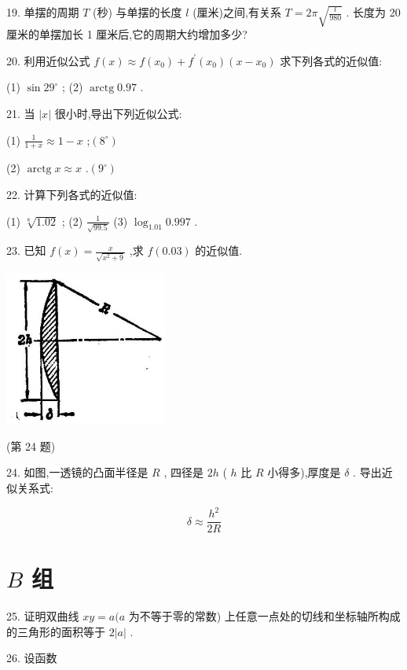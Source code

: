 \documentclass[lang=cn,newtx,12pt,scheme=chinese]{elegantbook}
\begin{document}
19. 单摆的周期 \(T\) (秒) 与单摆的长度 \(l\) (厘米)之间,有关系 \(T = {2\pi }\sqrt{\frac{l}{980}}\) . 长度为 20 厘米的单摆加长 1 厘米后,它的周期大约增加多少?

20. 利用近似公式 \(f\left( x\right) \approx f\left( {x}_{0}\right) + {f}^{\prime }\left( {x}_{0}\right) \left( {x - {x}_{0}}\right)\) 求下列各式的近似值:

(1) \(\sin {29}^{ \circ }\) ; (2) \(\operatorname{arctg}{0.97}\) .

21. 当 \(\left| x\right|\) 很小时,导出下列近似公式:

(1) \(\frac{1}{1 + x} \approx 1 - x\) ;\(\left( {8}^{ \circ }\right)\)

(2) \(\operatorname{arctg}x \approx x\) .\(\left( {9}^{ \circ }\right)\)

22. 计算下列各式的近似值:

(1) \(\sqrt[8]{1.02}\) ; (2) \(\frac{1}{\sqrt{99.5}}\) (3) \({\log }_{1.01}{0.997}\) .

23. 已知 \(f\left( x\right) = \frac{x}{\sqrt{{x}^{2} + 9}}\) ,求 \(f\left( {0.03}\right)\) 的近似值.

\begin{center}
\includegraphics[max width=0.4\textwidth]{images/01912c18-5c3f-733d-b775-749ba9897a9d_128_440234.jpg}
\end{center}

(第 24 题)

24. 如图,一透镜的凸面半径是 \(R\) , 四径是 \({2h}\) ( \(h\) 比 \(R\) 小得多),厚度是 \(\delta\) . 导出近似关系式:

\[
\delta \approx \frac{{h}^{2}}{2R}
\]

\section*{\(B\) 组}

25. 证明双曲线 \({xy} = a(a\) 为不等于零的常数) 上任意一点处的切线和坐标轴所构成的三角形的面积等于 \(2\left| a\right|\) .

26. 设函数
\end{document}

